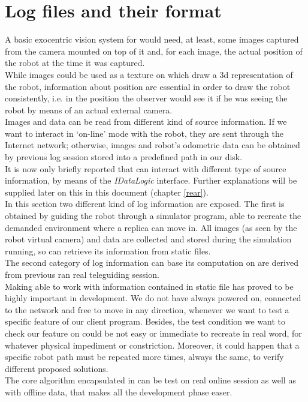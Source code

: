 \setcounter{figure}{0}
\setcounter{table}{0}
\setcounter{lstlisting}{0}

\chapter{Log files and their format}
\label{log}
\minitoc

A basic exocentric vision system for \morduc{} would need, 
at least, some images captured from the camera mounted 
on top of it and, for each image, the actual position of 
the robot at the time it was captured.
\\
While images could be used as a texture on which draw 
a 3d representation of the robot, information about 
position are essential in order to draw the robot 
consistently, i.e. in the position the observer would 
see it if he was seeing the robot by means of an actual 
external camera.
\\
Images and data can be read from different kind of source 
information. If we want to interact in `on-line' mode with
the robot, they are sent through the Internet network;
otherwise, images and robot's odometric data can be
obtained by previous log session stored into a predefined
path in our disk.
\\
It is now only briefly reported that
\framework{} can interact with different type of source
information, by means of the \textit{IDataLogic} interface.
Further explanations will be supplied later on this in this
document (chapter \ref{rear}).
\\
In this section two different kind of log information are
exposed. The first is obtained by guiding the robot through
a simulator program, able to recreate the demanded environment
where a \morduc{} replica can move in. All images (as seen by
the robot virtual camera) and data are collected and stored
during the simulation running, so \framework{} can retrieve
its information from static files.
\\
The second category of log information \framework{} can base
its computation on are derived from previous ran 
real \morduc{} teleguiding
session.
\\
Making \framework{} able to work with information contained in
static file has proved to be highly important in development.
We do not have \morduc{} always powered on, connected to the
network and free to move in any direction, whenever
we want to test a specific feature of our client program. Besides,
the test condition we want to check our feature on could be not easy
or immediate to recreate in real word, for whatever physical
impediment or constriction. Moreover, it could happen that a specific
robot
path must be repeated more times, always the same, to verify
different proposed solutions.
\\
The core algorithm encapsulated in \framework{} can be test
on real online session as well as with offline data, that 
makes all the development phase easer.


\clearpage


\clearpage

